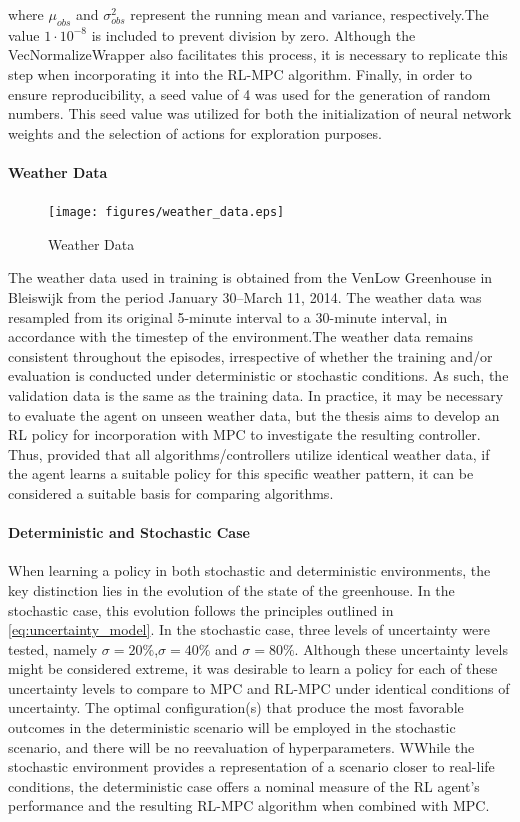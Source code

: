 where $\mu_{obs}$ and $\sigma^2_{obs}$ represent the running mean and variance, respectively.The value $1\cdot 10^{-8}$ is included to prevent division by zero. Although the VecNormalizeWrapper also facilitates this process, it is necessary to replicate this step when incorporating it into the RL-MPC algorithm. Finally, in order to ensure reproducibility, a seed value of 4 was used for the generation of random numbers.
This seed value was utilized for both the initialization of neural network weights and the selection of actions for exploration purposes.



\paragraph{Weather Data}

\begin{figure}[h]
    \centering
    \texttt{[image: figures/weather\_data.eps]}
    \caption{Weather Data}
    \label{fig:weather-data}
\end{figure}

The weather data used in training is obtained from the VenLow Greenhouse in Bleiswijk from the period January 30–March 11, 2014. The weather data was resampled from its original 5-minute interval to a 30-minute interval, in accordance with the timestep of the environment.The weather data remains consistent throughout the episodes, irrespective of whether the training and/or evaluation is conducted under deterministic or stochastic conditions. As such, the validation data is the same as the training data. In practice, it may be necessary to evaluate the agent on unseen weather data, but the thesis aims to develop an RL policy for incorporation with MPC to investigate the resulting controller. Thus, provided that all algorithms/controllers utilize identical weather data, if the agent learns a suitable policy for this specific weather pattern, it can be considered a suitable basis for comparing algorithms.


\paragraph{Deterministic and Stochastic Case}
When learning a policy in both stochastic and deterministic environments, the key distinction lies in the evolution of the state of the greenhouse. In the stochastic case, this evolution follows the principles outlined in \autoref{eq:uncertainty_model}. In the stochastic case, three levels of uncertainty were tested, namely $\sigma = 20\%$,$\sigma = 40\%$ and $\sigma = 80\%$. Although these uncertainty levels might be considered extreme, it was desirable to learn a policy for each of these uncertainty levels to compare to MPC and RL-MPC under identical conditions of uncertainty. The optimal configuration(s) that produce the most favorable outcomes in the deterministic scenario will be employed in the stochastic scenario, and there will be no reevaluation of hyperparameters. WWhile the stochastic environment provides a representation of a scenario closer to real-life conditions, the deterministic case offers a nominal measure of the RL agent's performance and the resulting RL-MPC algorithm when combined with MPC.

